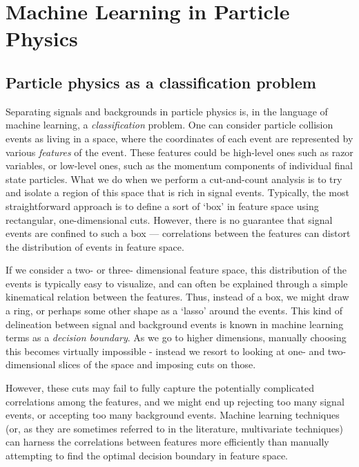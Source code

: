 \chapter{Machine Learning in Particle Physics}
\section{Particle physics as a classification problem}
Separating signals and backgrounds in particle physics is, in the language of machine learning, a \emph{classification} problem. One can consider particle collision events as living in a space, where the coordinates of each event are represented by various \emph{features} of the event. These features could be high-level ones such as razor variables, or low-level ones, such as the momentum components of individual final state particles. What we do when we perform a cut-and-count analysis is to try and isolate a region of this space that is rich in signal events. Typically, the most straightforward approach is to define a sort of `box' in feature space using rectangular, one-dimensional cuts. However, there is no guarantee that signal events are confined to such a box --- correlations between the features can distort the distribution of events in feature space. 

If we consider a two- or three- dimensional feature space, this distribution of the events is typically easy to visualize, and can often be explained through a simple kinematical relation between the features. Thus, instead of a box, we might draw a ring, or perhaps some other shape as a `lasso' around the events. This kind of delineation between signal and background events is known in machine learning terms as a \emph{decision boundary}. As we go to higher dimensions, manually choosing this becomes virtually impossible - instead we resort to looking at one- and two-dimensional slices of the space and imposing cuts on those. 

However, these cuts may fail to fully capture the potentially complicated correlations among the features, and we might end up rejecting too many signal events, or accepting too many background events. Machine learning techniques (or, as they are sometimes referred to in the literature, multivariate techniques) can harness the correlations between features more efficiently than manually attempting to find the optimal decision boundary in feature space.

